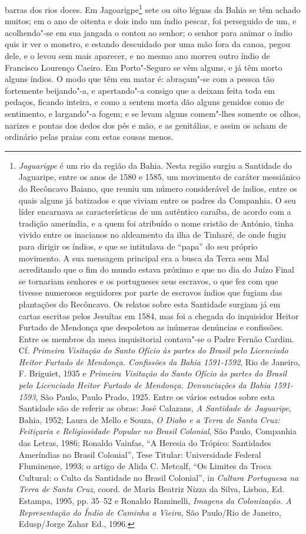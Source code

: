 barras dos rios doces. Em Jagoarigpe\footnote{ \textit{Jaguarigpe} é
um rio da região da Bahia. Nesta região surgiu a Santidade do
Jaguaripe, entre os anos de 1580 e 1585, um movimento de caráter
messiânico do Recôncavo Baiano, que reuniu um número considerável de
índios, entre os quais alguns já batizados e que viviam entre os
padres da Companhia. O seu líder encarnava as características de um
autêntico caraíba, de acordo com a tradição ameríndia, e a quem foi
atribuído o nome cristão de António, tinha vivido entre os inacianos no
aldeamento da ilha de Tinharé, de onde fugiu para dirigir os índios, e
que se intitulava de ``papa'' do seu próprio movimento. A sua mensagem
principal era a busca da Terra sem Mal acreditando que o fim do mundo
estava próximo e que no dia do Juízo Final se tornariam senhores e os
portugueses seus escravos, o que fez com que tivesse numerosos
seguidores por parte de escravos índios que fugiam das plantações do
Recôncavo. Os relatos sobre esta Santidade surgiam já em cartas
escritas pelos Jesuítas em 1584, mas foi a chegada do inquisidor Heitor
Furtado de Mendonça que despoletou as inúmeras denúncias e confissões.
Entre os membros da mesa inquisitorial contava"-se o Padre Fernão
Cardim. Cf. \textit{Primeira Visitação do Santo Ofício às partes do
Brasil pelo Licenciado Heitor Furtado de Mendonça. Confissões da Bahia
1591-1592}, Rio de Janeiro, F. Briguiet, 1935 e \textit{Primeira
Visitação do Santo Ofício às partes do Brasil pelo Licenciado Heitor
Furtado de Mendonça. Denunciações da Bahia 1591-1593}, São Paulo, Paulo
Prado, 1925. Entre os vários estudos sobre esta Santidade são de
referir as obras: José Calazans, \textit{A Santidade de Jaguaripe}, 
Bahia, 1952; Laura de Mello e Souza, \textit{O Diabo e a Terra de
Santa Cruz: Feitiçaria e Religiosidade Popular no Brasil Colonial}, 
São Paulo, Companhia das Letras, 1986; Ronaldo Vainfas, ``A Heresia do 
Trópico: Santidades Ameríndias no Brasil Colonial'', Tese Titular:
Universidade Federal Fluminense, 1993; o artigo de Alida C. Metcalf, ``Os 
Limites da Troca Cultural: o Culto da Santidade no Brasil Colonial'',
in \textit{Cultura Portuguesa na Terra de Santa Cruz}, coord. de Maria
Beatriz Nizza da Silva, Lisboa, Ed. Estampa, 1995, pp. 35--52 e Ronaldo
Raminelli, \textit{Imagens da Colonização. A Representação do Índio de
Caminha a Vieira}, São Paulo/Rio de Janeiro, Edusp/Jorge Zahar Ed.,
1996.} sete ou oito léguas da Bahia se têm achado muitos; em o ano de
oitenta e dois indo um índio pescar, foi perseguido de um, e
acolhendo"-se em sua jangada o contou ao senhor; o senhor para animar o
índio quis ir ver o monstro, e estando descuidado por uma mão fora da
canoa, pegou dele, e o levou sem mais aparecer, e no mesmo ano morreu
outro índio de Francisco Lourenço Caeiro. Em Porto"-Seguro se vêm
alguns, e já têm morto alguns índios. O modo que têm em matar é:
abraçam"-se com a pessoa tão fortemente beijando"-a, e apertando"-a
consigo que a deixam feita toda em pedaços, ficando inteira, e como a
sentem morta dão alguns gemidos como de sentimento, e largando"-a fogem;
e se levam alguns comem"-lhes somente os olhos, narizes e pontas dos
dedos dos pés e mão, e as genitálias, e assim os acham de ordinário
pelas praias com estas cousas menos.

